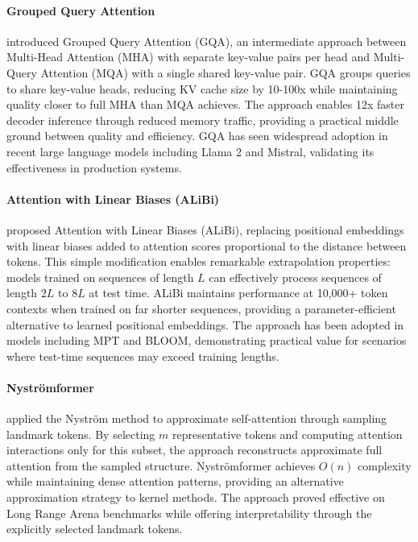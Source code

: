 \documentclass[11pt,letterpaper]{article}
\begin{document}
\paragraph{Grouped Query Attention}

\cite{ainslie2023gqa} introduced Grouped Query Attention (GQA), an intermediate approach between Multi-Head Attention (MHA) with separate key-value pairs per head and Multi-Query Attention (MQA) with a single shared key-value pair. GQA groups queries to share key-value heads, reducing KV cache size by 10-100x while maintaining quality closer to full MHA than MQA achieves. The approach enables 12x faster decoder inference through reduced memory traffic, providing a practical middle ground between quality and efficiency. GQA has seen widespread adoption in recent large language models including Llama 2 and Mistral, validating its effectiveness in production systems.

\paragraph{Attention with Linear Biases (ALiBi)}

\cite{press2022train} proposed Attention with Linear Biases (ALiBi), replacing positional embeddings with linear biases added to attention scores proportional to the distance between tokens. This simple modification enables remarkable extrapolation properties: models trained on sequences of length $L$ can effectively process sequences of length $2L$ to $8L$ at test time. ALiBi maintains performance at 10,000+ token contexts when trained on far shorter sequences, providing a parameter-efficient alternative to learned positional embeddings. The approach has been adopted in models including MPT and BLOOM, demonstrating practical value for scenarios where test-time sequences may exceed training lengths.

\paragraph{Nyströmformer}

\cite{xiong2021nystromformer} applied the Nyström method to approximate self-attention through sampling landmark tokens. By selecting $m$ representative tokens and computing attention interactions only for this subset, the approach reconstructs approximate full attention from the sampled structure. Nyströmformer achieves $O(n)$ complexity while maintaining dense attention patterns, providing an alternative approximation strategy to kernel methods. The approach proved effective on Long Range Arena benchmarks while offering interpretability through the explicitly selected landmark tokens.
\end{document}
